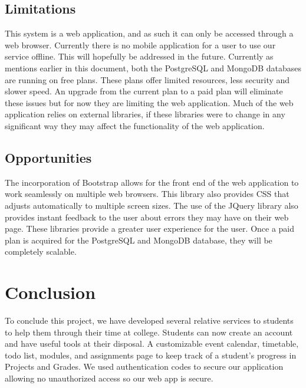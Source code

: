 \section{Limitations}
This system is a web application, and as such it can only be accessed through a web browser. Currently there is no mobile application for a user to use our service offline. This will hopefully be addressed in the future. Currently as mentions earlier in this document, both the PostgreSQL and MongoDB databases are running on free plans. These plans offer limited resources, less security and slower speed. An upgrade from the current plan to a paid plan will eliminate these issues but for now they are limiting the web application. Much of the web application relies on external libraries, if these libraries were to change in any significant way they may affect the functionality of the web application.

\section{Opportunities} The incorporation of Bootstrap allows for the front end of the web application to work seamlessly on multiple web browsers. This library also provides CSS that adjusts automatically to multiple screen sizes. The use of the JQuery library also provides instant feedback to the user about errors they may have on their web page. These libraries provide a greater user experience for the user. Once a paid plan is acquired for the PostgreSQL and MongoDB database, they will be completely scalable.

\chapter{Conclusion}
To conclude this project, we have developed several relative services to students to help them through their time at college. Students can now create an account and have useful tools at their disposal. A customizable event calendar, timetable, todo list, modules, and assignments page to keep track of a student’s progress in Projects and Grades. We used authentication codes to secure our application allowing no unauthorized access so our web app is secure. 


